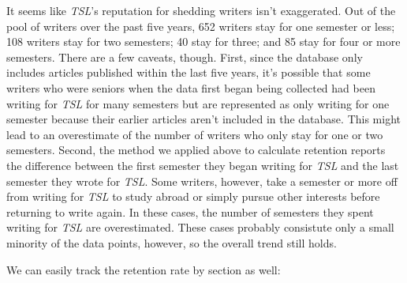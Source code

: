 \documentclass[a4paper]{article}
\begin{document}
It seems like \textit{TSL}'s reputation for shedding writers isn't exaggerated. Out of the pool of writers over the past five years, 652 writers stay for one semester or less; 108 writers stay for two semesters; 40 stay for three; and 85 stay for four or more semesters. There are a few caveats, though. First, since the database only includes articles published within the last five years, it's possible that some writers who were seniors when the data first began being collected had been writing for \textit{TSL} for many semesters but are represented as only writing for one semester because their earlier articles aren't included in the database. This might lead to an overestimate of the number of writers who only stay for one or two semesters. Second, the method we applied above to calculate retention reports the difference between the first semester they began writing for \textit{TSL} and the last semester they wrote for \textit{TSL}. Some writers, however, take a semester or more off from writing for \textit{TSL} to study abroad or simply pursue other interests before returning to write again. In these cases, the number of semesters they spent writing for \textit{TSL} are overestimated. These cases probably consistute only a small minority of the data points, however, so the overall trend still holds.

We can easily track the retention rate by section as well:
\end{document}
